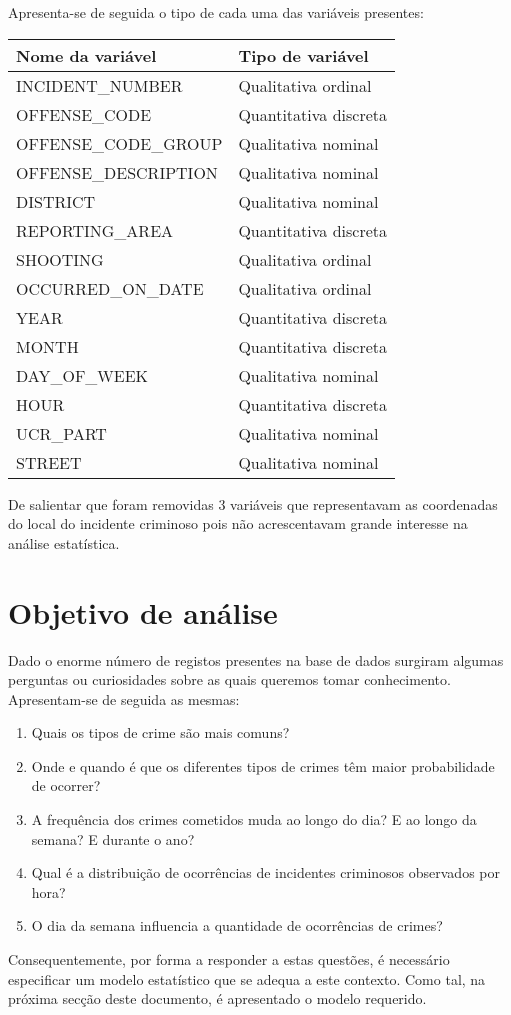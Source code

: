 \documentclass[a4paper]{report}
\begin{document}
{	Apresenta-se de seguida o tipo de cada uma das variáveis presentes:
	\begin{center}
		\begin{tabular}{ | l | l | }
		\hline
		\textbf{Nome da variável} & \textbf{Tipo de variável} \\ \hline
		INCIDENT\_NUMBER & Qualitativa ordinal \\ \hline
		OFFENSE\_CODE & Quantitativa discreta \\ \hline
		OFFENSE\_CODE\_GROUP & Qualitativa nominal \\ \hline
		OFFENSE\_DESCRIPTION & Qualitativa nominal \\ \hline
		DISTRICT & Qualitativa nominal \\ \hline
		REPORTING\_AREA & Quantitativa discreta \\ \hline
		SHOOTING & Qualitativa ordinal \\ \hline
		OCCURRED\_ON\_DATE & Qualitativa ordinal \\ \hline
		YEAR & Quantitativa discreta \\ \hline
		MONTH & Quantitativa discreta \\ \hline
		DAY\_OF\_WEEK & Qualitativa nominal \\ \hline
		HOUR & Quantitativa discreta \\ \hline
		UCR\_PART & Qualitativa nominal \\ \hline
		STREET & Qualitativa nominal \\ \hline
		\end{tabular}
	\end{center}
	
	De salientar que foram removidas 3 variáveis que representavam as coordenadas do local do incidente criminoso pois não acrescentavam grande interesse na análise estatística. 
	
	\section{Objetivo de análise}
	Dado o enorme número de registos presentes na base de dados surgiram algumas perguntas ou curiosidades sobre as quais queremos tomar conhecimento. Apresentam-se de seguida as mesmas:
	\begin{enumerate}
	    \item Quais os tipos de crime são mais comuns?
	    \item Onde e quando é que os diferentes tipos de crimes têm maior probabilidade de ocorrer?
	    \item A frequência dos crimes cometidos muda ao longo do dia? E ao longo da semana? E durante o ano?
	    \item Qual é a distribuição de ocorrências de incidentes criminosos observados por hora?
	    \item O dia da semana influencia a quantidade de ocorrências de crimes?
	\end{enumerate}
	
	Consequentemente, por forma a responder a estas questões, é necessário especificar um modelo estatístico que se adequa a este contexto. Como tal, na próxima secção deste documento, 
	é apresentado o modelo requerido.
}
\end{document}
